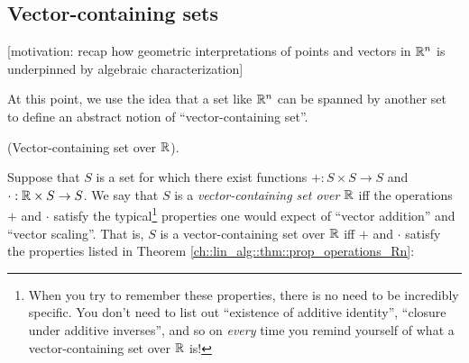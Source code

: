 \newpage

\subsection*{Vector-containing sets}

[motivation: recap how geometric interpretations of points and vectors in $\mathbb{R}^n$ is underpinned by algebraic characterization]

At this point, we use the idea that a set like $\mathbb{R}^n$ can be spanned by another set to define an abstract notion of ``vector-containing set''. 

\begin{defn}
    (Vector-containing set over $\mathbb{R}$).
    
    Suppose that $S$ is a set for which there exist functions $+:S \times S \rightarrow S$ and $\cdot:\mathbb{R} \times S \rightarrow S$. We say that $S$ is a \textit{vector-containing set over $\mathbb{R}$} iff the operations $+$ and $\cdot$ satisfy the typical\footnote{When you try to remember these properties, there is no need to be incredibly specific. You don't need to list out ``existence of additive identity'', ``closure under additive inverses'', and so on \textit{every} time you remind yourself of what a vector-containing set over $\mathbb{R}$ is!} properties one would expect of ``vector addition'' and ``vector scaling''. That is, $S$ is a vector-containing set over $\mathbb{R}$ iff $+$ and $\cdot$ satisfy the properties listed in Theorem \ref{ch::lin_alg::thm::prop_operations_Rn}:
    

\end{defn}
